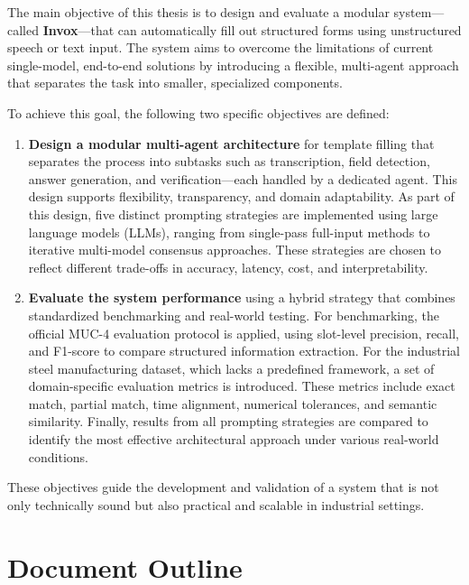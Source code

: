 The main objective of this thesis is to design and evaluate a modular system—called \textbf{Invox}—that can automatically fill out structured forms using unstructured speech or text input. The system aims to overcome the limitations of current single-model, end-to-end solutions by introducing a flexible, multi-agent approach that separates the task into smaller, specialized components.

To achieve this goal, the following two specific objectives are defined:

\begin{enumerate}
    \item \textbf{Design a modular multi-agent architecture} for template filling that separates the process into subtasks such as transcription, field detection, answer generation, and verification—each handled by a dedicated agent. This design supports flexibility, transparency, and domain adaptability. As part of this design, five distinct prompting strategies are implemented using large language models (LLMs), ranging from single-pass full-input methods to iterative multi-model consensus approaches. These strategies are chosen to reflect different trade-offs in accuracy, latency, cost, and interpretability.

    \item \textbf{Evaluate the system performance} using a hybrid strategy that combines standardized benchmarking and real-world testing. For benchmarking, the official MUC-4 evaluation protocol \cite{chinchor1992muc4} is applied, using slot-level precision, recall, and F1-score to compare structured information extraction. For the industrial steel manufacturing dataset, which lacks a predefined framework, a set of domain-specific evaluation metrics is introduced. These metrics include exact match, partial match, time alignment, numerical tolerances, and semantic similarity. Finally, results from all prompting strategies are compared to identify the most effective architectural approach under various real-world conditions.
\end{enumerate}

These objectives guide the development and validation of a system that is not only technically sound but also practical and scalable in industrial settings.


\section{Document Outline}

